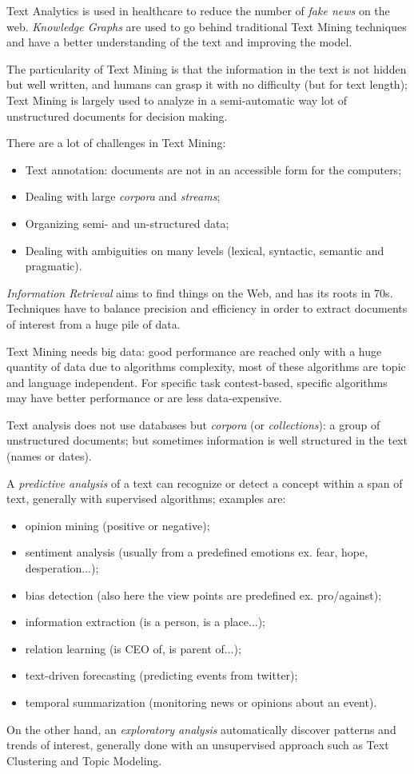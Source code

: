 \documentclass[11pt, a4page]{article}
\begin{document}
Text Analytics is used in healthcare to reduce the number of \textit{fake news} on the web.
\textit{Knowledge Graphs} are used to go behind traditional Text Mining techniques and have a better understanding of the text and improving the model.

The particularity of Text Mining is that the information in the text is not hidden but well written, and humans can grasp it with no difficulty (but for text length); Text Mining is largely used to analyze in a semi-automatic way lot of unstructured documents for decision making.

There are a lot of challenges in Text Mining:
\begin{itemize}[noitemsep]
\item Text annotation: documents are not in an accessible form for the computers;
\item Dealing with large \textit{corpora} and \textit{streams};
\item Organizing semi- and un-structured data;
\item Dealing with ambiguities on many levels (lexical, syntactic, semantic and pragmatic).
\end{itemize}

\textit{Information Retrieval} aims to find things on the Web, and has its roots in 70s.
Techniques have to balance precision and efficiency in order to extract documents of interest from a huge pile of data.

Text Mining needs big data: good performance are reached only with a huge quantity of data due to algorithms complexity, most of these algorithms are topic and language independent.
For specific task contest-based, specific algorithms may have better performance or are less data-expensive.

Text analysis does not use databases but \textit{corpora} (or \textit{collections}): a group of unstructured documents; but sometimes information is well structured in the text (names or dates). 

A \textit{predictive analysis} of a text can recognize or detect a concept within a span of text, generally with supervised algorithms; examples are:
\begin{itemize}[noitemsep]
	\item opinion mining (positive or negative);
	\item sentiment analysis (usually from a predefined emotions ex. fear, hope, desperation...);
	\item bias detection (also here the view points are predefined ex. pro/against);
	\item information extraction (is a person, is a place...);
	\item relation learning (is CEO of, is parent of...);
	\item text-driven forecasting (predicting events from twitter);
	\item temporal summarization (monitoring news or opinions about an event).
\end{itemize}
On the other hand, an \textit{exploratory analysis} automatically discover patterns and trends of interest, generally done with an unsupervised approach such as Text Clustering and Topic Modeling.
\end{document}
